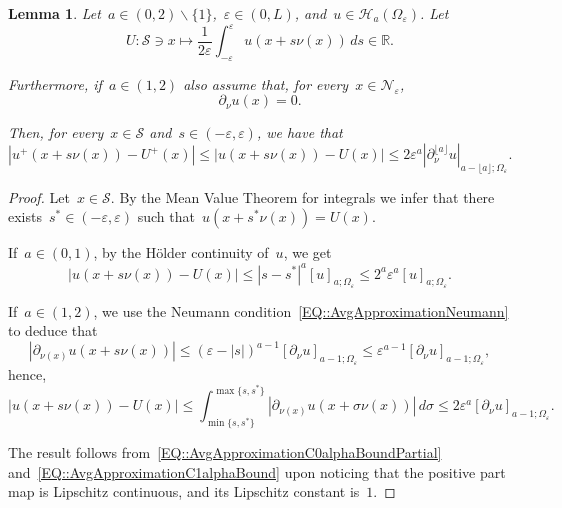 \documentclass[12pt,a4paper]{amsart}
\numberwithin{equation}{section}
\newtheorem{lemma}[theorem]{Lemma}
\theoremstyle{definition}
\theoremstyle{remark}
\newcommand{\R}{\mathbb{R}}
\newcommand{\eps}{\varepsilon}
\newcommand{\abs}[1]{\left\lvert#1\right\rvert}
\renewcommand{\leq}{\leqslant}
\begin{document}
\begin{lemma}\label{LEM::AvgApproximation}
    Let~$a \in (0,2)\smallsetminus \{1\}$,~$\eps \in (0,L)$, and~$u \in \mathcal{H}_a\left(\Omega_\eps\right)$. Let
    \begin{equation}
        U \colon \mathcal{S} \ni x \longmapsto \frac{1}{2\eps}\int_{-\eps}^{\eps} u(x+s\nu(x))\,ds \in \R.
    \end{equation}
    
    Furthermore, if~$a \in (1,2)$ also assume that, for every~$x \in \mathcal{N}_\eps$,
    \begin{equation}\label{EQ::AvgApproximationNeumann}
        \partial_\nu u(x) = 0.
    \end{equation}

    Then, for every~$x \in \mathcal{S}$ and~$s \in (-\eps, \eps)$, we have that
    \begin{equation}\label{EQ::AvgApproximationC0alphaBound}
        \abs{u^+(x + s \nu(x)) - U^+(x)} \leq \abs{u(x + s \nu(x)) - U(x)} \leq 2\eps^{a} \abs{\partial_{\nu}^{\lfloor a \rfloor} u}_{a-\lfloor a \rfloor; \Omega_\eps}.
    \end{equation}
\end{lemma}
\begin{proof}
        
    Let~$x \in \mathcal{S}$. By the Mean Value Theorem for integrals we infer that there exists~$s^\ast \in (-\eps, \eps)$ such that~$u(x+s^\ast \nu(x)) = U(x)$.

    If~$a \in (0,1)$, by the Hölder continuity of~$u$, we get
    \begin{equation}\label{EQ::AvgApproximationC0alphaBoundPartial}
        \abs{u(x + s \nu(x)) - U(x)} \leq \abs{s - s^\ast}^a {\left[ u \right]}_{a; \Omega_\eps} \leq 2^{a} \eps^a {\left[ u \right]}_{a; \Omega_\eps}.
    \end{equation}

    If~$a\in(1,2)$, we use the Neumann condition~\eqref{EQ::AvgApproximationNeumann} to deduce that
    \begin{equation}\label{EQ::AvgApproximationGradientC0alphaBound}
        \abs{\partial_{\nu(x)}u(x + s \nu(x))} \leq {(\eps - \abs{s})}^{a-1} {\left[ \partial_\nu u \right]}_{a-1; \Omega_\eps} \leq \eps^{a-1}{\left[ \partial_\nu u \right]}_{a-1; \Omega_\eps},
    \end{equation}
    hence,
    \begin{equation}\label{EQ::AvgApproximationC1alphaBound}
        \abs{u(x + s \nu(x)) - U(x)} \leq \int_{\min\{s, s^\ast\}}^{\max\{s, s^\ast\}} \abs{\partial_{\nu(x)}u(x + \sigma \nu(x))}\,d\sigma \leq 2\eps^{a}{\left[ \partial_\nu u \right]}_{a-1; \Omega_\eps}.
    \end{equation}

    The result follows from~\eqref{EQ::AvgApproximationC0alphaBoundPartial} and~\eqref{EQ::AvgApproximationC1alphaBound} upon noticing that the positive part map is Lipschitz continuous, and its Lipschitz constant is~$1$.
\end{proof}
\end{document}
